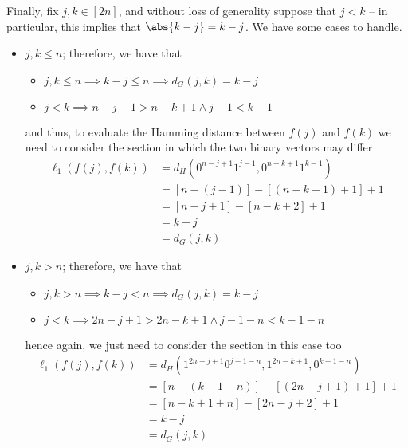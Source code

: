 \documentclass[a4paper, 12pt]{report}
\begin{document}
{        Finally, fix $j, k \in [2n]$, and without loss of generality suppose that $j < k$ -- in particular, this implies that $\abs{k - j} = k - j$. We have some cases to handle.

        \begin{itemize}
            \item $j, k \le n$; therefore, we have that
                \begin{itemize}
                    \item $j, k \le n \implies k - j \le n \implies d_G(j, k) = k - j$
                    \item $j < k \implies n - j + 1 > n - k + 1 \land j - 1 < k - 1$
                \end{itemize}
                and thus, to evaluate the Hamming distance between $f(j)$ and $f(k)$ we need to consider the  section in which the two binary vectors may differ
                \begin{equation*}
                    \begin{split}
                        \ell_1(f(j), f(k)) &= d_H(0^{n - j + 1}1^{j - 1}, 0^{n - k + 1}1^{k - 1}) \\
                                           &= [n - (j - 1)] - [(n - k + 1) + 1] + 1 \\
                                           &= [n - j + 1] - [n - k + 2] + 1 \\
                                           &= k - j \\
                                           &= d_G(j, k)
                    \end{split}
                \end{equation*}

            \item $j, k > n$; therefore, we have that
                \begin{itemize}
                    \item $j, k > n \implies k - j < n \implies d_G(j, k) = k - j$
                    \item $j < k \implies 2n - j + 1 > 2n - k + 1 \land j - 1 - n < k - 1 - n$
                \end{itemize}
                hence again, we just need to consider the  section in this case too
                \begin{equation*}
                    \begin{split}
                        \ell_1(f(j), f(k)) &= d_H(1^{2n - j + 1}0^{j - 1- n}, 1^{2n - k + 1}, 0^{k - 1- n}) \\
                                           &= [n - (k - 1- n)] - [(2n - j + 1) + 1] + 1 \\
                                           &= [n - k + 1 + n] - [2n - j + 2] + 1 \\
                                           &= k - j \\
                                           &= d_G(j, k)
                    \end{split}
                \end{equation*}


\end{itemize}}
\end{document}
